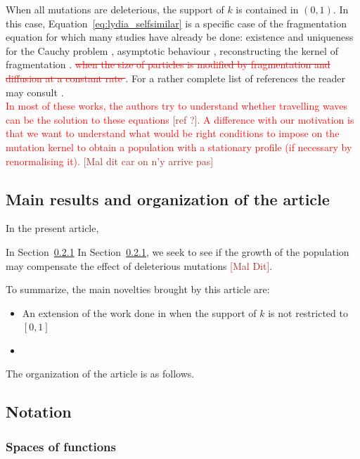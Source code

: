 \documentclass[11pt]{amsart}
\newcommand{\ndr}[1]{\textcolor{brown}{[#1]}}
\newcommand{\guim}[1]{\textcolor{red}{#1}}
\newcommand{\guimrem}[1]{\textcolor{red}{\sout{#1}}}
\begin{document}
When all mutations are deleterious, the support of $k$ is contained in $(0,1)$. In this case, Equation~\eqref{eq:lydia_selfsimilar} is a specific case of the fragmentation equation for which many studies have already be done: existence and uniqueness for the Cauchy problem \cite{melzak1957scalar}, asymptotic behaviour \cite{doumic2016time}, reconstructing the kernel of fragmentation \cite{hoang2017estimating,hoang2017nonparametric, doumic2018estimating,doumic2021inverse}. \guimrem{when the size of particles is modified by fragmentation and diffusion at a constant rate \cite{laurenccot2022fragmentation}}. 
For a rather complete list of references the reader may consult \cite{banasiak2019analytic}.\\

\guim{
In most of these works, the authors try to understand whether travelling waves can be the solution to these equations \ndr{ref ?}. A difference with our motivation is that we want to understand what would be right conditions to impose on the mutation kernel to obtain a population with a stationary profile (if necessary by renormalising it).} \ndr{Mal dit car on n'y arrive pas}\\
    

\subsection{Main results and organization of the article} \mbox{}

In the present article, 

In Section~\ref{}
In Section~\ref{}, we seek to see if the growth of the population may compensate the effect of deleterious mutations \ndr{Mal Dit}. 

To summarize, the main novelties brought by this article are: 
\begin{itemize}
    \item An extension of the work done in \cite{doumic2016time} when the support of $k$ is not restricted to $[0,1]$
    \item 
\end{itemize}

The organization of the article is as follows.

\subsection{Notation}

\subsubsection{Spaces of functions}
\end{document}
